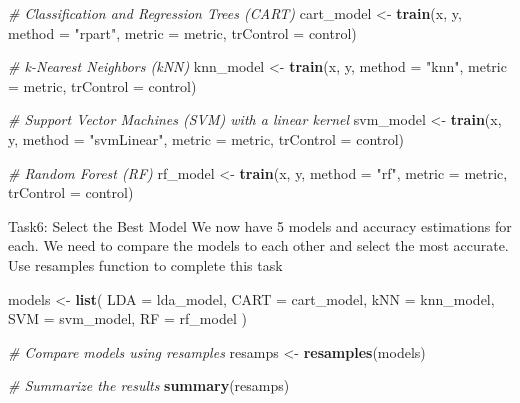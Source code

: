 \documentclass[
]{article}
\newenvironment{Shaded}{\begin{snugshade}}{\end{snugshade}}
\newcommand{\AttributeTok}[1]{\textcolor[rgb]{0.13,0.29,0.53}{#1}}
\newcommand{\CommentTok}[1]{\textcolor[rgb]{0.56,0.35,0.01}{\textit{#1}}}
\newcommand{\FunctionTok}[1]{\textcolor[rgb]{0.13,0.29,0.53}{\textbf{#1}}}
\newcommand{\NormalTok}[1]{#1}
\newcommand{\OtherTok}[1]{\textcolor[rgb]{0.56,0.35,0.01}{#1}}
\newcommand{\StringTok}[1]{\textcolor[rgb]{0.31,0.60,0.02}{#1}}
\begin{document}
\begin{Shaded}
\begin{Highlighting}[]
\CommentTok{\# Classification and Regression Trees (CART)}
\NormalTok{cart\_model }\OtherTok{\textless{}{-}} \FunctionTok{train}\NormalTok{(x, y, }\AttributeTok{method =} \StringTok{"rpart"}\NormalTok{, }\AttributeTok{metric =}\NormalTok{ metric, }\AttributeTok{trControl =}\NormalTok{ control)}
\end{Highlighting}
\end{Shaded}

\begin{Shaded}
\begin{Highlighting}[]
\CommentTok{\# k{-}Nearest Neighbors (kNN)}
\NormalTok{knn\_model }\OtherTok{\textless{}{-}} \FunctionTok{train}\NormalTok{(x, y, }\AttributeTok{method =} \StringTok{"knn"}\NormalTok{, }\AttributeTok{metric =}\NormalTok{ metric, }\AttributeTok{trControl =}\NormalTok{ control)}
\end{Highlighting}
\end{Shaded}

\begin{Shaded}
\begin{Highlighting}[]
\CommentTok{\# Support Vector Machines (SVM) with a linear kernel}
\NormalTok{svm\_model }\OtherTok{\textless{}{-}} \FunctionTok{train}\NormalTok{(x, y, }\AttributeTok{method =} \StringTok{"svmLinear"}\NormalTok{, }\AttributeTok{metric =}\NormalTok{ metric, }\AttributeTok{trControl =}\NormalTok{ control)}
\end{Highlighting}
\end{Shaded}

\begin{Shaded}
\begin{Highlighting}[]
\CommentTok{\# Random Forest (RF)}
\NormalTok{rf\_model }\OtherTok{\textless{}{-}} \FunctionTok{train}\NormalTok{(x, y, }\AttributeTok{method =} \StringTok{"rf"}\NormalTok{, }\AttributeTok{metric =}\NormalTok{ metric, }\AttributeTok{trControl =}\NormalTok{ control)}
\end{Highlighting}
\end{Shaded}

Task6: Select the Best Model We now have 5 models and accuracy
estimations for each. We need to compare the models to each other and
select the most accurate. Use resamples function to complete this task

\begin{Shaded}
\begin{Highlighting}[]
\NormalTok{models }\OtherTok{\textless{}{-}} \FunctionTok{list}\NormalTok{(}
  \AttributeTok{LDA =}\NormalTok{ lda\_model,}
  \AttributeTok{CART =}\NormalTok{ cart\_model,}
  \AttributeTok{kNN =}\NormalTok{ knn\_model,}
  \AttributeTok{SVM =}\NormalTok{ svm\_model,}
  \AttributeTok{RF =}\NormalTok{ rf\_model}
\NormalTok{)}

\CommentTok{\# Compare models using resamples}
\NormalTok{resamps }\OtherTok{\textless{}{-}} \FunctionTok{resamples}\NormalTok{(models)}

\CommentTok{\# Summarize the results}
\FunctionTok{summary}\NormalTok{(resamps)}
\end{Highlighting}
\end{Shaded}
\end{document}
